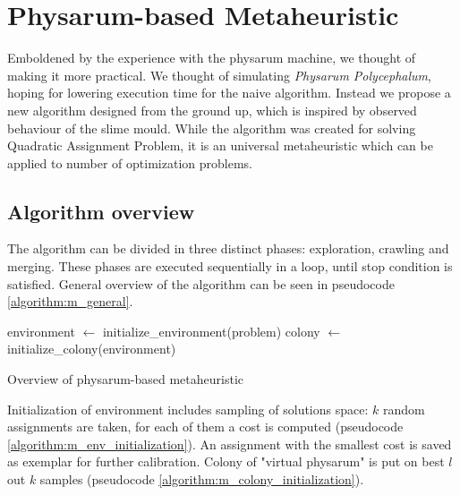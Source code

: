 \section{Physarum-based Metaheuristic}
\label{section:algorithm_metaheuristic}

Emboldened by the experience with the physarum machine, we thought of making it more practical. We thought of simulating \textit{Physarum Polycephalum}, hoping for lowering execution time for the naive algorithm. Instead we propose a new algorithm designed from the ground up, which is inspired by observed behaviour of the slime mould. While the algorithm was created for solving Quadratic Assignment Problem, it is an universal metaheuristic which can be applied to number of optimization problems.


\subsection{Algorithm overview}

The algorithm can be divided in three distinct phases: exploration, crawling and merging. These phases are executed sequentially in a loop, until stop condition is satisfied. General overview of the algorithm can be seen in pseudocode \ref{algorithm:m_general}. 

\begin{algorithm}[H]
  \BlankLine

  environment $\leftarrow$ initialize\_environment(problem)\;
  colony $\leftarrow$ initialize\_colony(environment)\;


  \;

  \caption{Overview of physarum-based metaheuristic}
  \label{algorithm:m_general}
\end{algorithm}

Initialization of environment includes sampling of solutions space: $k$ random assignments are taken, for each of them a cost is computed (pseudocode \ref{algorithm:m_env_initialization}). An assignment with the smallest cost is saved as exemplar for further calibration. Colony of "virtual physarum" is put on best $l$ out $k$ samples (pseudocode \ref{algorithm:m_colony_initialization}).

